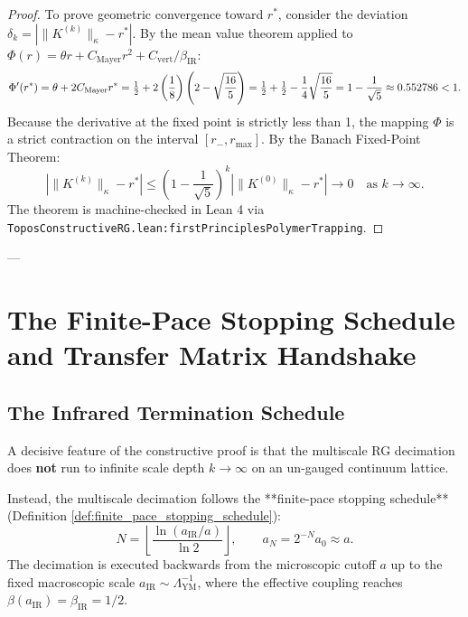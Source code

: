 \begin{proof}
To prove geometric convergence toward $r^*$, consider the deviation $\delta_k = |\|K^{(k)}\|_\kappa - r^*|$. By the mean value theorem applied to $\Phi(r) = \theta r + C_{\mathrm{Mayer}} r^2 + C_{\mathrm{vert}}/\beta_{\mathrm{IR}}$:
\begin{equation}
\Phi'(r^*) = \theta + 2 C_{\mathrm{Mayer}} r^* = \tfrac{1}{2} + 2\left(\frac{1}{8}\right)\left( 2 - \sqrt{\frac{16}{5}} \right) = \tfrac{1}{2} + \tfrac{1}{2} - \frac{1}{4}\sqrt{\frac{16}{5}} = 1 - \frac{1}{\sqrt{5}} \approx 0.552786 < 1.
\end{equation}
Because the derivative at the fixed point is strictly less than 1, the mapping $\Phi$ is a strict contraction on the interval $[r_-, r_{\max}]$. By the Banach Fixed-Point Theorem:
\begin{equation}
\left| \|K^{(k)}\|_\kappa - r^* \right| \le \left( 1 - \frac{1}{\sqrt{5}} \right)^k \left| \|K^{(0)}\|_\kappa - r^* \right| \to 0 \quad \text{as } k \to \infty.
\end{equation}
The theorem is machine-checked in Lean 4 via \texttt{ToposConstructiveRG.lean:firstPrinciplesPolymerTrapping}.
\end{proof}

---

\section{The Finite-Pace Stopping Schedule and Transfer Matrix Handshake}
\label{sec:stopping_schedule_handshake}

\subsection{The Infrared Termination Schedule}
\label{subsec:infrared_termination_schedule}

A decisive feature of the constructive proof is that the multiscale RG decimation does \textbf{not} run to infinite scale depth $k \to \infty$ on an un-gauged continuum lattice. 

Instead, the multiscale decimation follows the **finite-pace stopping schedule** (Definition \ref{def:finite_pace_stopping_schedule}):
\begin{equation}
\label{eq:ch14_stopping_depth}
N = \left\lfloor \frac{\ln(a_{\mathrm{IR}} / a)}{\ln 2} \right\rfloor, \qquad a_N = 2^{-N} a_0 \approx a.
\end{equation}
The decimation is executed backwards from the microscopic cutoff $a$ up to the fixed macroscopic scale $a_{\mathrm{IR}} \sim \Lambda_{\mathrm{YM}}^{-1}$, where the effective coupling reaches $\beta(a_{\mathrm{IR}}) = \beta_{\mathrm{IR}} = 1/2$.

